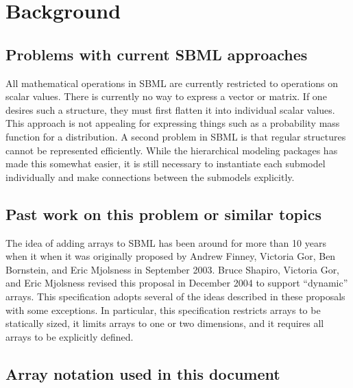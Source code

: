
\section{ Background }
\label{background}

\subsection{ Problems with current SBML approaches }

All mathematical operations in SBML are currently restricted to operations on scalar values.  There is currently no way to express a vector or matrix.  If one desires such a structure, they must first flatten it into individual scalar values.  This approach is not appealing for expressing things such as a probability mass function for a distribution.  A second problem in SBML is that regular structures cannot be represented efficiently.  While the hierarchical modeling packages has made this somewhat easier, it is still necessary to instantiate each submodel individually and make connections between the submodels explicitly.  

\subsection{ Past work on this problem or similar topics }

The idea of adding arrays to SBML has been around for more than 10 years when it when it was originally proposed by Andrew Finney, Victoria Gor, Ben Bornstein, and Eric Mjolsness in September 2003.   Bruce Shapiro, Victoria Gor, and Eric Mjolsness revised this proposal in December 2004 to support ``dynamic'' arrays.  This specification adopts several of the ideas described in these proposals with some exceptions.  In particular, this specification restricts arrays to be statically sized, it limits arrays to one or two dimensions, and it requires all arrays to be explicitly defined.  

\subsection{Array notation used in this document}

